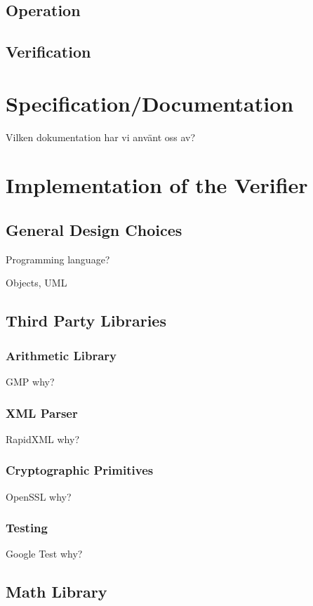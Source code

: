 \documentclass[10pt,a4paper]{article}
\begin{document}
\subsection{Operation}

\subsection{Verification}

\section{Specification/Documentation}

Vilken dokumentation har vi använt oss av?


\section{Implementation of the Verifier}

\subsection{General Design Choices}

Programming language?

Objects, UML


\subsection{Third Party Libraries}

\subsubsection{Arithmetic Library}
GMP
why?

\subsubsection{XML Parser}
RapidXML
why?

\subsubsection{Cryptographic Primitives}
OpenSSL
why?

\subsubsection{Testing}
Google Test
why?

\subsection{Math Library}
\end{document}
